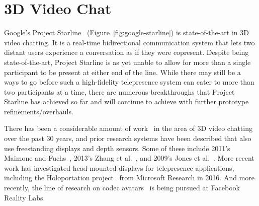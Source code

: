 \section{3D Video Chat}\label{sec:3d-video-chat}

Google's Project Starline~\cite{lawrence_project_2021} (Figure~\ref{fig:google-starline}) is state-of-the-art in 3D video chatting. It is a real-time bidirectional communication system that lets two distant users experience a conversation as if they were copresent. Despite being state-of-the-art, Project Starline is as yet unable to allow for more than a single participant to be present at either end of the line. While there may still be a ways to go before such a high-fidelity telepresence system can cater to more than two participants at a time, there are numerous breakthroughs that Project Starline has achieved so far and will continue to achieve with further prototype refinements/overhauls.

There has been a considerable amount of work~\cite{google_ar__vr_project_2021} in the area of 3D video chatting over the past 30 years, and prior research systems have been described that also use freestanding displays and depth sensors. Some of these include 2011's Maimone and Fuchs~\cite{maimone_encumbrance-free_2011}, 2013's Zhang et al.~\cite{zhang_viewport_2013}, and 2009's Jones et al.~\cite{jones_achieving_2009}. More recent work has investigated head-mounted displays for telepresence applications, including the Holoportation project~\cite{orts-escolano_holoportation_2016} from Microsoft Research in 2016. And more recently, the line of research on codec avatars~\cite{chu_expressive_2020} is being pursued at Facebook Reality Labs.

